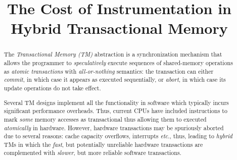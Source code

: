 \documentclass[11pt,pdftex,a4paper]{article}%
\begin{document}


\title{The Cost of Instrumentation in Hybrid Transactional Memory}
\date{}
\maketitle
%
\thispagestyle{empty}
%
\begin{abstract}
The \emph{Transactional Memory (TM)} abstraction is a synchronization mechanism 
that allows the programmer to \emph{speculatively} execute sequences of shared-memory
operations as \emph{atomic transactions} with \emph{all-or-nothing} semantics: 
the transaction can either \emph{commit}, in which case it appears as executed sequentially,
or \emph{abort}, in which case its update operations do not take effect.

Several TM designs implement all the functionality in software which typically incurs significant performance overheads.
Thus, current CPUs have included instructions to mark \emph{some} memory accesses as transactional thus allowing them to executed \emph{atomically} in hardware.
However, hardware transactions may be spuriously aborted due to several reasons: cache capacity overflows, interrupts \emph{etc}., thus, leading to
\emph{hybrid} TMs in which the \emph{fast}, but potentially unreliable hardware
transactions are complemented with \emph{slower}, but more reliable software transactions.

\end{abstract}

\newpage

{}\setcounter{page}{1}


%

%

%

%

%

%
\newpage

\appendix
%

\end{document}
